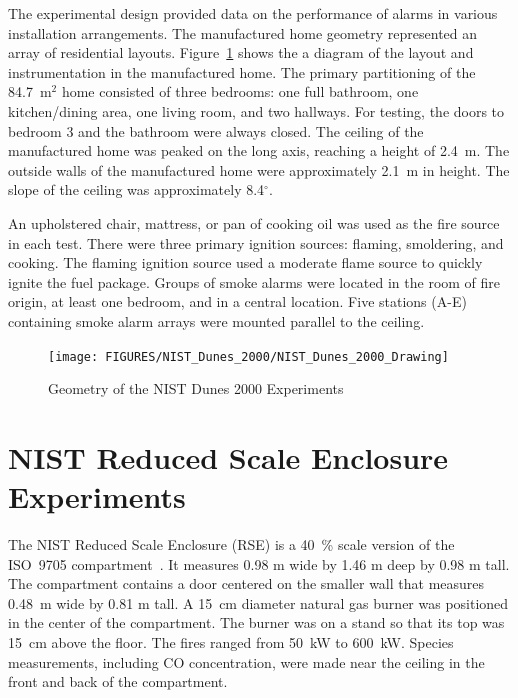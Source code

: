 The experimental design provided data on the performance of alarms in various installation arrangements.
The manufactured home geometry represented an array of residential layouts.
Figure~\ref{NIST_Dunes_2000_Drawing} shows the a diagram of the layout and instrumentation in the
manufactured home. The primary partitioning of the 84.7~m$^2$ home consisted of three bedrooms:
one full bathroom, one kitchen/dining area, one living room, and two hallways. For testing, the doors
to bedroom 3 and the bathroom were always closed. The ceiling of the manufactured home
was peaked on the long axis, reaching a height of 2.4~m. The outside walls of the manufactured home
were approximately 2.1~m in height. The slope of the ceiling was approximately 8.4$^\circ$.

An upholstered chair, mattress, or pan of cooking oil was used as the fire source in each test.
There were three primary ignition sources: flaming, smoldering, and cooking.
The flaming ignition source used a moderate flame source to quickly ignite the fuel package. 
Groups of smoke alarms were located in the room of fire origin, at least one bedroom, and
in a central location. Five stations (A-E) containing smoke alarm arrays were mounted parallel to the ceiling.

\begin{figure}
\begin{center}
\texttt{[image: FIGURES/NIST\_Dunes\_2000/NIST\_Dunes\_2000\_Drawing]}
\end{center}
\caption{Geometry of the NIST Dunes 2000 Experiments}
\label{NIST_Dunes_2000_Drawing}
\end{figure}


\clearpage

\section{NIST Reduced Scale Enclosure Experiments}

The NIST Reduced Scale Enclosure (RSE) is a 40~\% scale version of the ISO~9705 compartment~\cite{Bryner:1}.
It measures 0.98 m wide by 1.46 m deep by 0.98 m tall.  The compartment contains a door centered on the smaller
wall that measures 0.48~m wide by 0.81 m tall.  A 15~cm diameter natural gas burner was positioned in the
center of the compartment.  The burner was on a stand so that its top was 15~cm above the floor. 
The fires ranged from 50~kW to 600~kW.
Species measurements, including CO concentration, were made near the ceiling in the front and back of the compartment.


